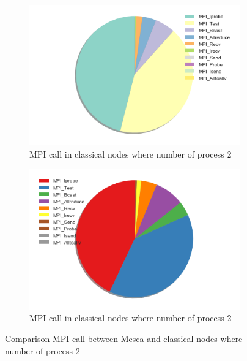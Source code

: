 \begin{figure}[!h]
\centering 
  \begin{subfigure}[b]{0.7\textwidth}
    \includegraphics[width=\textwidth]{images/PieInca2process.png}
    \caption{MPI call in classical nodes where number of process 2}
    \label{MPIProfInca}
  \end{subfigure}
  \begin{subfigure}[b]{0.7\textwidth}
    \includegraphics[width=\textwidth]{images/PieMesca2process.png}
    \caption{MPI call in classical nodes where number of process 2}
    \label{MPIProfMesc}
  \end{subfigure}
  \caption{Comparison MPI call between Mesca and classical nodes where number of process 2}
\end{figure}

